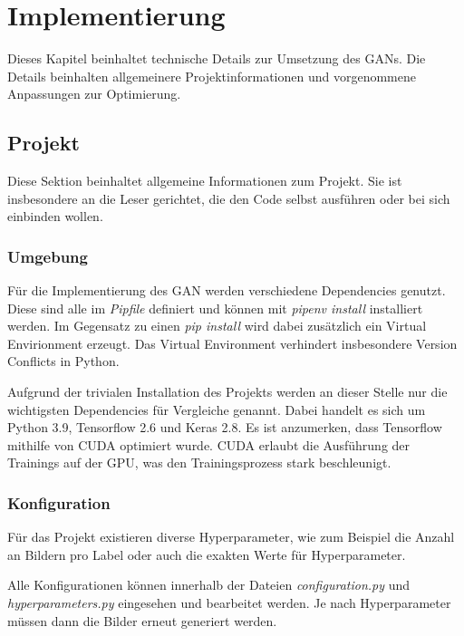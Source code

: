 
\chapter{Implementierung}
Dieses Kapitel beinhaltet technische Details zur Umsetzung des GANs.
Die Details beinhalten allgemeinere Projektinformationen und vorgenommene Anpassungen zur Optimierung.

\section{Projekt}
Diese Sektion beinhaltet allgemeine Informationen zum Projekt.
Sie ist insbesondere an die Leser gerichtet, die den Code selbst ausführen oder bei sich einbinden wollen.

\subsection{Umgebung}
Für die Implementierung des GAN werden verschiedene Dependencies genutzt.
Diese sind alle im \textit{Pipfile} definiert und können mit \textit{pipenv install} installiert werden.
Im Gegensatz zu einen \textit{pip install} wird dabei zusätzlich ein Virtual Envirionment erzeugt.
Das Virtual Environment verhindert insbesondere Version Conflicts in Python.
\newline

Aufgrund der trivialen Installation des Projekts werden an dieser Stelle nur die wichtigsten Dependencies für Vergleiche genannt.
Dabei handelt es sich um Python 3.9, Tensorflow 2.6 und Keras 2.8.
Es ist anzumerken, dass Tensorflow mithilfe von CUDA optimiert wurde.
CUDA erlaubt die Ausführung der Trainings auf der GPU, was den Trainingsprozess stark beschleunigt.

\subsection{Konfiguration}
\label{chapter:configuration-hyperparams}
Für das Projekt existieren diverse Hyperparameter, wie zum Beispiel die Anzahl an Bildern pro Label oder auch die exakten Werte für Hyperparameter.
\newline

Alle Konfigurationen können innerhalb der Dateien \textit{configuration.py} und \textit{hyperparameters.py} eingesehen und bearbeitet werden.
Je nach Hyperparameter müssen dann die Bilder erneut generiert werden.
\newline

